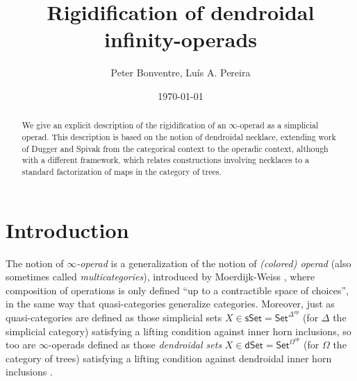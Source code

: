 \documentclass[a4paper,10pt
,draft
]{article}%
\title{Rigidification of dendroidal infinity-operads}
\author{Peter Bonventre, Lu\'is A. Pereira}%
\date{\today}
\numberwithin{equation}{section}
\numberwithin{figure}{section}
\theoremstyle{definition} %
\newcommand{\1}{\ensuremath{\mathbbm 1}}%
\begin{document}
\maketitle

\begin{abstract}
	We give an explicit description
	of the rigidification of an $\infty$-operad
	as a simplicial operad.
	This description is based on the notion of 
	dendroidal necklace, 
	extending work of 
	Dugger and Spivak
	from the categorical context to 
	the operadic context,
	although with a different framework,
	which relates constructions involving necklaces 
	to a standard factorization
	of maps in the category of trees.
\end{abstract}

\tableofcontents







\section{Introduction}

The notion of \emph{$\infty$-operad} is a generalization of the notion of \emph{(colored) operad}
(also sometimes called \emph{multicategories}),
introduced by Moerdijk-Weiss \cite{MW07},
where composition of operations is only defined 
``up to a contractible space of choices'',
in the same way that quasi-categories generalize categories.
Moreover, just as quasi-categories are defined as those simplicial sets 
$X \in \mathsf{sSet} = \mathsf{Set}^{\Delta^{op}}$
(for $\Delta$ the simplicial category)
satisfying a lifting condition against inner horn inclusions,
so too are $\infty$-operads defined as those \emph{dendroidal sets}
$X \in \mathsf{dSet} = \mathsf{Set}^{\Omega^{op}}$
(for $\Omega$ the category of trees)
satisfying a lifting condition against 
dendroidal inner horn inclusions \cite[\S 2.1]{CM11}.
\end{document}
